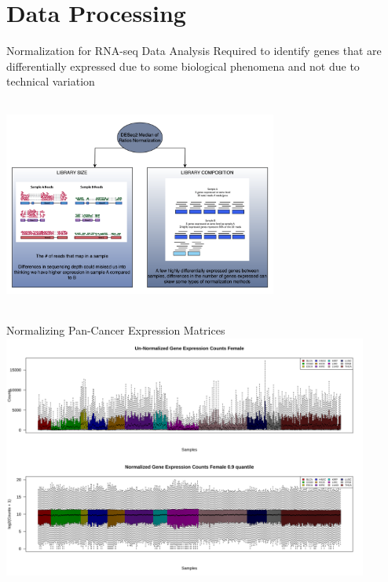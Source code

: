 \documentclass{beamer}
\begin{document}
	\section{Data Processing}
	\begin{frame}{Normalization for RNA-seq Data Analysis}
		\centering Required to identify genes that are differentially expressed due to some biological phenomena and not due to technical variation
		
		\includegraphics[width=9cm,height=7cm]{img4.png}
	\end{frame}

	\begin{frame}{Normalizing Pan-Cancer Expression Matrices}
		\includegraphics[width=12cm, height=8cm]{all_cancers-F_before_and_after_normalization_v.png}
	\end{frame}
\end{document}
